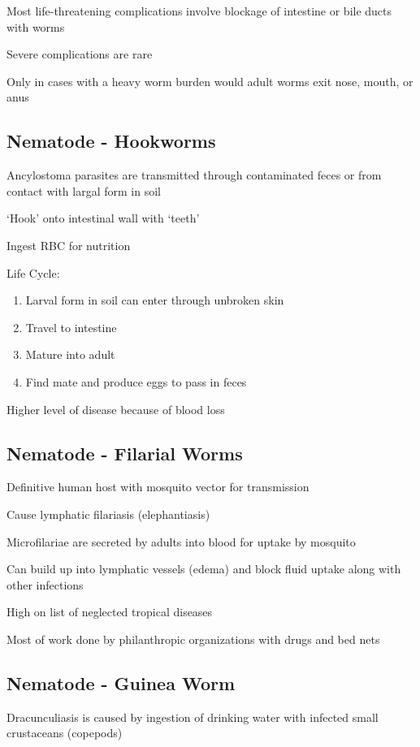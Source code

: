 \documentclass{notes}
\begin{document}
Most life-threatening complications involve blockage of intestine or bile ducts with worms

\tab \indicates Severe complications are rare

Only in cases with a heavy worm burden would adult worms exit nose, mouth, or anus

\subsection*{Nematode - Hookworms}
Ancylostoma parasites are transmitted through contaminated feces or from contact with largal form in soil

`Hook' onto intestinal wall with `teeth'

Ingest RBC for nutrition

Life Cycle:
\begin{enumerate}
    \item Larval form in soil can enter through unbroken skin
    \item Travel to intestine
    \item Mature into adult
    \item Find mate and produce eggs to pass in feces
\end{enumerate}

Higher level of disease because of blood loss

\subsection*{Nematode - Filarial Worms}
Definitive human host with mosquito vector for transmission

Cause lymphatic filariasis (elephantiasis)

Microfilariae are secreted by adults into blood for uptake by mosquito

\tab \indicates Can build up into lymphatic vessels (edema) and block fluid uptake along with other infections

High on list of neglected tropical diseases

\tab \indicates Most of work done by philanthropic organizations with drugs and bed nets

\subsection*{Nematode - Guinea Worm}
Dracunculiasis is caused by ingestion of drinking water with infected small crustaceans (copepods)
\end{document}
